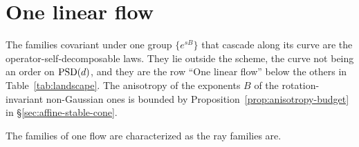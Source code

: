 
\section{One linear flow}\label{app:linear-flow}

The families covariant under one group $\{e^{sB}\}$ that cascade along its curve are the
operator-self-decomposable laws. They lie outside the scheme, the curve not being an order on
$\mathrm{PSD}(d)$, and they are the row ``One linear flow'' below the others in Table~\ref{tab:landscape}. The anisotropy of the exponents
$B$ of the rotation-invariant non-Gaussian ones is bounded by Proposition~\ref{prop:anisotropy-budget}
in \S\ref{sec:affine-stable-cone}.

The families of one flow are characterized as the ray families are.

